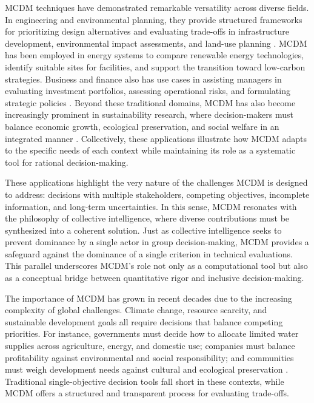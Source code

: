 MCDM techniques have demonstrated remarkable versatility across diverse fields. In engineering and environmental planning, they provide structured frameworks for prioritizing design alternatives and evaluating trade-offs in infrastructure development, environmental impact assessments, and land-use planning \cite{karakus2022,Dirie2024}. MCDM has been employed in energy systems to compare renewable energy technologies, identify suitable sites for facilities, and support the transition toward low-carbon strategies\cite{Romanelli2018}. Business and finance also has use cases in assisting managers in evaluating investment portfolios, assessing operational risks, and formulating strategic policies \cite{TAMIZ1998}. Beyond these traditional domains, MCDM has also become increasingly prominent in sustainability research, where decision-makers must balance economic growth, ecological preservation, and social welfare in an integrated manner \cite{ettazarini2021,Mardani2015}. Collectively, these applications illustrate how MCDM adapts to the specific needs of each context while maintaining its role as a systematic tool for rational decision-making.

These applications highlight the very nature of the challenges MCDM is designed to address: decisions with multiple stakeholders, competing objectives, incomplete information, and long-term uncertainties. In this sense, MCDM resonates with the philosophy of collective intelligence, where diverse contributions must be synthesized into a coherent solution\cite{Cinalli2015}. Just as collective intelligence seeks to prevent dominance by a single actor in group decision-making, MCDM provides a safeguard against the dominance of a single criterion in technical evaluations. This parallel underscores MCDM's role not only as a computational tool but also as a conceptual bridge between quantitative rigor and inclusive decision-making.   

The importance of MCDM has grown in recent decades due to the increasing complexity of global challenges. Climate change, resource scarcity, and sustainable development goals all require decisions that balance competing priorities. For instance, governments must decide how to allocate limited water supplies across agriculture, energy, and domestic use; companies must balance profitability against environmental and social responsibility; and communities must weigh development needs against cultural and ecological preservation \cite{KUMAR2017596,PortnerIPCC2022}. Traditional single-objective decision tools fall short in these contexts, while MCDM offers a structured and transparent process for evaluating trade-offs.

